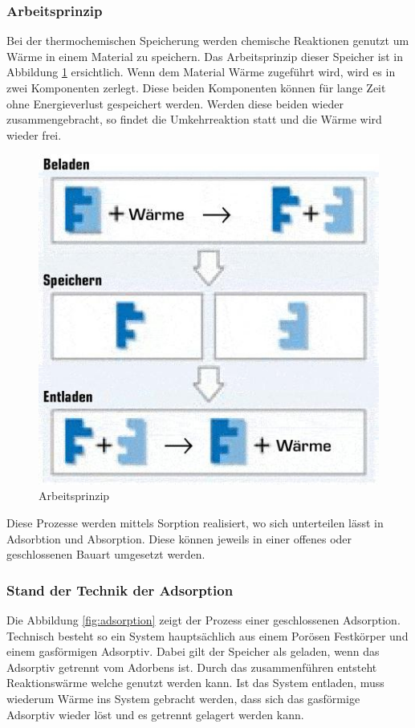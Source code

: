 \documentclass[11pt,a4paper]{scrartcl}
\begin{document}
\subsubsection{Arbeitsprinzip}
Bei der thermochemischen Speicherung werden chemische Reaktionen genutzt um
Wärme in einem Material zu speichern. Das Arbeitsprinzip dieser Speicher ist in
Abbildung \ref{fig:ladenspeichernentladens} ersichtlich. Wenn dem Material Wärme
zugeführt wird, wird es in zwei Komponenten zerlegt. Diese beiden Komponenten
können für lange Zeit ohne Energieverlust gespeichert werden. Werden diese
beiden wieder zusammengebracht, so findet die Umkehrreaktion statt und die Wärme
wird wieder frei.

\begin{figure}[h!]
\begin{center}
\includegraphics[scale=0.6]{images/ladenspeichernentladen.jpg}
\caption{Arbeitsprinzip \cite{ladenspeichernentladen}}
\label{fig:ladenspeichernentladens}
\end{center}
\end{figure}

Diese Prozesse werden mittels Sorption realisiert, wo sich unterteilen lässt in
Adsorbtion und Absorption. Diese können jeweils in einer offenes oder
geschlossenen Bauart umgesetzt werden.

\subsubsection{Stand der Technik der Adsorption}
Die Abbildung \ref{fig:adsorption} zeigt der Prozess einer geschlossenen
Adsorption. Technisch besteht so ein System hauptsächlich aus einem Porösen
Festkörper und einem gasförmigen Adsorptiv. Dabei gilt der Speicher als geladen,
wenn das Adsorptiv getrennt vom Adorbens ist. Durch das zusammenführen entsteht
Reaktionswärme welche genutzt werden kann. Ist das System entladen, muss
wiederum Wärme ins System gebracht werden, dass sich das gasförmige Adsorptiv
wieder löst und es getrennt gelagert werden kann.
\end{document}

